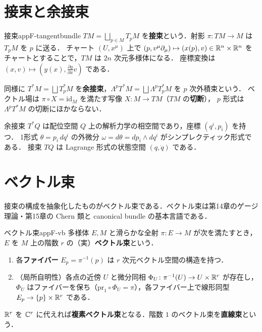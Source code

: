 \section{接束と余接束}

\begin{mydef}{接束}{appF-tangentbundle}
$TM=\bigsqcup_{p\in M}T_pM$ を\textbf{接束}という．射影 $\pi\colon TM\to M$ は $T_pM$ を $p$ に送る．
チャート $(U,x^\mu)$ 上で $(p,v^\mu\partial_\mu)\mapsto(x(p),v)\in\mathbb{R}^n\times\mathbb{R}^n$ をチャートとすることで，$TM$ は $2n$ 次元多様体になる．
座標変換は $(x,v)\mapsto(y(x),\frac{\partial y}{\partial x}v)$ である．
\end{mydef}

同様に $T^*M=\bigsqcup T_p^*M$ を\textbf{余接束}，$\Lambda^pT^*M=\bigsqcup\Lambda^pT_p^*M$ を $p$ 次外積束という．
ベクトル場は $\pi\circ X=\mathrm{id}_M$ を満たす写像 $X\colon M\to TM$（$TM$ の\textbf{切断}），
$p$ 形式は $\Lambda^pT^*M$ の切断にほかならない．

\begin{physbox}[相空間]
余接束 $T^*Q$ は配位空間 $Q$ 上の解析力学の相空間であり，座標 $(q^i,p_i)$ を持つ．
1形式 $\theta=p_i\,dq^i$ の外微分 $\omega=d\theta=dp_i\wedge dq^i$ がシンプレクティック形式である．
接束 $TQ$ は Lagrange 形式の状態空間 $(q,\dot q)$ である．
\end{physbox}

\section{ベクトル束}

接束の構成を抽象化したものがベクトル束である．ベクトル束は第14章のゲージ理論・第15章の Chern 類と canonical bundle の基本言語である．

\begin{mydef}{ベクトル束}{appF-vb}
多様体 $E,M$ と滑らかな全射 $\pi\colon E\to M$ が次を満たすとき，$E$ を $M$ 上の階数 $r$ の（実）\textbf{ベクトル束}という．
\begin{enumerate}
\item 各\textbf{ファイバー} $E_p=\pi^{-1}(p)$ は $r$ 次元ベクトル空間の構造を持つ．
\item （局所自明性）各点の近傍 $U$ と微分同相 $\Phi_U\colon\pi^{-1}(U)\to U\times\mathbb{R}^r$ が存在し，
$\Phi_U$ はファイバーを保ち（$\mathrm{pr}_1\circ\Phi_U=\pi$），各ファイバー上で線形同型 $E_p\to\{p\}\times\mathbb{R}^r$ である．
\end{enumerate}
$\mathbb{R}^r$ を $\mathbb{C}^r$ に代えれば\textbf{複素ベクトル束}となる．階数 $1$ のベクトル束を\textbf{直線束}という．
\end{mydef}

